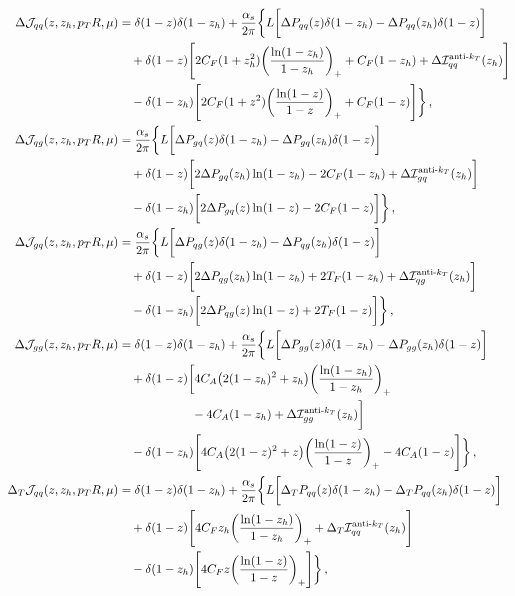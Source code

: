 \documentclass[a4paper, 11 pt]{article}
\begin{document}
\begin{align}
\Delta \mathcal{J}_{qq} (z, z_h, p_TR,  \mu)
& =
\delta (1-z) \delta (1-z_h) + \frac{\alpha _s}{2 \pi} \bigg\{L \bigg[\Delta P_{qq} (z) \delta (1-z_h) - \Delta P_{qq} (z_h) \delta (1-z) \bigg]
\nonumber \\
& \quad +
\delta (1-z) \bqty{2 C_F (1+z_h^2) \pqty{\frac{\ln(1-z_h)}{1-z_h}}_+ + C_F (1-z_h) + \Delta \mathcal{I}_{qq}^{\text{anti-}k_T}(z_h)} \nonumber \\
& \quad -
\delta (1-z_h) \bqty{2 C_F (1+z^2) \pqty{\frac{\ln(1-z)}{1-z}}_+ + C_F (1-z)} \bigg\}
\, , \\
\Delta \mathcal{J}_{qg} (z, z_h, p_TR,  \mu)
& =
\frac{\alpha _s}{2 \pi} \bigg\{L \bigg[\Delta P_{gq}(z) \delta (1-z_h) - \Delta P_{gq}(z_h) \delta (1-z) \bigg]
\nonumber \\
& \quad +
\delta (1-z) \bigg[2 \Delta P_{gq}(z_h) \ln(1-z_h) - 2 C_F (1-z_h) + \Delta \mathcal{I}_{gq}^{\text{anti-}k_T}(z_h) \bigg]
\nonumber \\
& \quad
- \delta (1-z_h) \bigg[2 \Delta P_{gq}(z) \ln(1-z) - 2 C_F (1-z) \bigg] \bigg\}
\, , \\
\Delta \mathcal{J}_{gq} (z, z_h, p_TR,  \mu)
& =
\frac{\alpha _s}{2 \pi} \bigg\{L \bigg[\Delta P_{qg}(z) \delta (1-z_h) - \Delta P_{qg}(z_h) \delta (1-z) \bigg]
\nonumber \\
& \quad
+ \delta (1-z) \bigg[2 \Delta P_{qg}(z_h) \ln(1-z_h) + 2 T_F (1-z_h) + \Delta \mathcal{I}_{qg}^{\text{anti-}k_T}(z_h) \bigg]
\nonumber \\
& \quad
- \delta (1-z_h) \bigg[2 \Delta P_{qg}(z) \ln(1-z) + 2 T_F (1-z) \bigg] \bigg\}
\, , \\
\Delta \mathcal{J}_{gg} (z, z_h, p_TR,  \mu)
& =
\delta (1-z) \delta (1-z_h) + \frac{\alpha _s}{2 \pi} \bigg\{L \bigg[\Delta P_{gg}(z) \delta (1-z_h) - \Delta P_{gg}(z_h) \delta (1-z) \bigg]
\nonumber \\
& \quad
+ \delta (1-z) \bigg[4 C_A \pqty{2 (1-z_h)^2 + z_h} \pqty{\frac{\ln(1-z_h)}{1-z_h}}_+
\nonumber \\
& \qquad \qquad \qquad -
4 C_A (1-z_h) + \Delta \mathcal{I}_{gg}^{\text{anti-}k_T}(z_h) \bigg]
\nonumber \\
& \quad -
\delta (1-z_h) \bqty{4 C_A \pqty{2(1-z)^2 + z} \pqty{\frac{\ln(1-z)}{1-z}}_+ - 4 C_A (1-z)} \bigg\}
\, , \\
\Delta _T \mathcal{J}_{qq} (z, z_h, p_TR,  \mu)
& =
\delta (1-z) \delta (1-z_h) + \frac{\alpha _s}{2 \pi} \bigg\{L \bigg[\Delta _T P_{qq}(z) \delta (1-z_h) - \Delta _T P_{qq}(z_h) \delta (1-z) \bigg]
\nonumber \\
& \quad +
\delta (1-z) \bqty{4 C_F z_h \pqty{\frac{\ln(1-z_h)}{1-z_h}}_+ + \Delta _T \mathcal{I}_{qq}^{\text{anti-}k_T}(z_h)}
\nonumber \\
& \quad -
\delta (1-z_h) \bqty{4 C_F z \pqty{\frac{\ln(1-z)}{1-z}}_+} \bigg\}
\, ,
\end{align}
\end{document}
